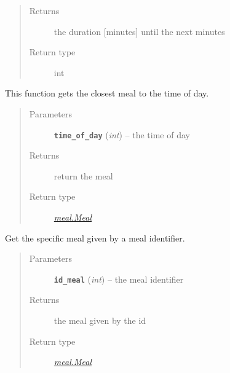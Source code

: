 \documentclass[letterpaper,10pt,english]{sphinxmanual}
\begin{document}
\begin{fulllineitems}
\begin{fulllineitems}
\begin{quote}
\begin{description}
\item[{Returns}] \leavevmode
the duration {[}minutes{]} until the next minutes

\item[{Return type}] \leavevmode
int

\end{description}\end{quote}

\end{fulllineitems}


\begin{fulllineitems}
\label{social:social.Social.get_current_meal}
This function gets the closest meal to the time of day.
\begin{quote}\begin{description}
\item[{Parameters}] \leavevmode
\textbf{\texttt{time\_of\_day}} (\emph{int}) -- the time of day

\item[{Returns}] \leavevmode
return the meal

\item[{Return type}] \leavevmode
{\hyperref[meal:meal.Meal]{\emph{meal.Meal}}}

\end{description}\end{quote}

\end{fulllineitems}


\begin{fulllineitems}
\label{social:social.Social.get_meal}
Get the specific meal given by a meal identifier.
\begin{quote}\begin{description}
\item[{Parameters}] \leavevmode
\textbf{\texttt{id\_meal}} (\emph{int}) -- the meal identifier

\item[{Returns}] \leavevmode
the meal given by the id

\item[{Return type}] \leavevmode
{\hyperref[meal:meal.Meal]{\emph{meal.Meal}}}

\end{description}\end{quote}


\end{fulllineitems}
\end{fulllineitems}
\end{document}
